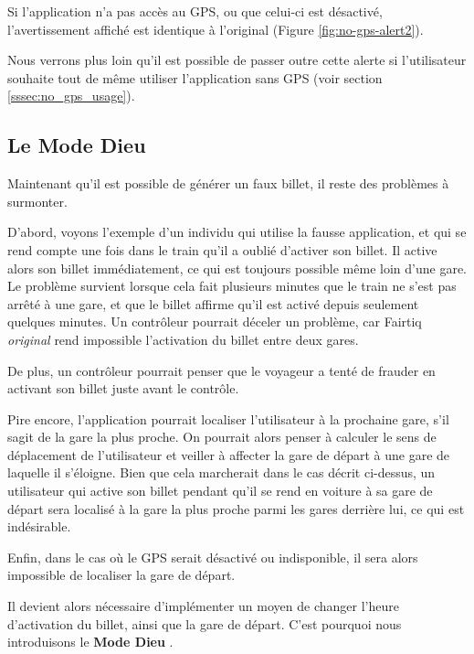 \documentclass[a4paper]{article}
\newcommand{\modedieu}{\og Mode Dieu \fg}
\begin{document}
Si l'application n'a pas accès au GPS, ou que celui-ci est désactivé,
l'avertissement affiché est identique à l'original (Figure \ref{fig:no-gps-alert2}).

Nous verrons plus loin qu'il est possible de passer outre cette alerte si l'utilisateur souhaite
tout de même utiliser l'application sans GPS (voir section \ref*{sssec:no_gps_usage}).


\clearpage

\subsection{Le \modedieu}
Maintenant qu'il est possible de générer un faux billet, il reste des problèmes à surmonter.

D'abord, voyons l'exemple d'un individu qui utilise la fausse application, et qui se rend compte
une fois dans le train qu'il a oublié d'activer son billet. Il active alors son billet
immédiatement, ce qui est toujours possible même loin d'une gare. Le problème survient
lorsque cela fait plusieurs minutes que le train ne s'est pas
arrêté à une gare, et que le billet affirme qu'il est activé depuis seulement quelques minutes.
Un contrôleur pourrait déceler un problème, car Fairtiq \textit{original} rend impossible l'activation
du billet entre deux gares.\par
De plus, un contrôleur pourrait penser que le voyageur a tenté de frauder en activant
son billet juste avant le contrôle.

Pire encore, l'application pourrait localiser l'utilisateur à la prochaine gare, s'il sagit de la
gare la plus proche. On pourrait alors penser à calculer le sens de déplacement de l'utilisateur et veiller à
affecter la gare de départ à une gare de laquelle il s'éloigne. Bien que cela marcherait dans le cas
décrit ci-dessus, un utilisateur qui active son billet pendant qu'il se rend en voiture
à sa gare de départ sera localisé à la gare la plus proche parmi les gares derrière lui,
ce qui est indésirable.

Enfin, dans le cas où le GPS serait désactivé ou indisponible, il sera alors impossible de
localiser la gare de départ.

Il devient alors nécessaire d'implémenter un moyen de changer l'heure d'activation du billet,
ainsi que la gare de départ. C'est pourquoi nous introduisons le \textbf{\modedieu}.
\end{document}
